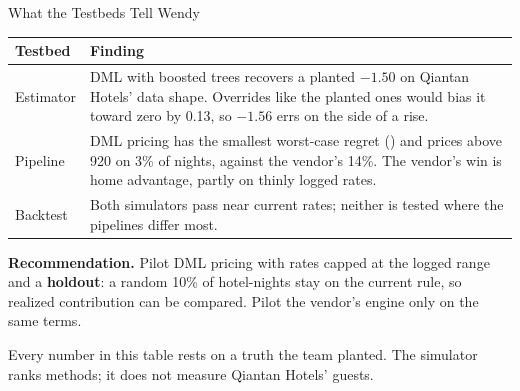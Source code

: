 \documentclass[aspectratio=169, 11pt, handout]{beamer}
\begin{document}
\begin{frame}{What the Testbeds Tell Wendy}

\begin{center}
\small
\begin{tabular}{p{3.3cm}p{9.4cm}}
\toprule
\textbf{Testbed} & \textbf{Finding} \\
\midrule
Estimator & DML with boosted trees recovers a planted $-1.50$ on Qiantan Hotels' data shape. Overrides like the planted ones would bias it toward zero by 0.13, so $-1.56$ errs on the side of a rise. \\[0.3em]
Pipeline & DML pricing has the smallest worst-case regret (\textyen 760) and prices above \textyen 1{,}920 on 3\% of nights, against the vendor's 14\%. The vendor's win is home advantage, partly on thinly logged rates. \\[0.3em]
Backtest & Both simulators pass near current rates; neither is tested where the pipelines differ most. \\
\bottomrule
\end{tabular}
\end{center}

\medskip

\textbf{Recommendation.} Pilot DML pricing with rates capped at the logged range and a \textbf{holdout}: a random 10\% of hotel-nights stay on the current rule, so realized contribution can be compared. Pilot the vendor's engine only on the same terms.

\medskip

Every number in this table rests on a truth the team planted. The simulator ranks methods; it does not measure Qiantan Hotels' guests.
\end{frame}
\end{document}
